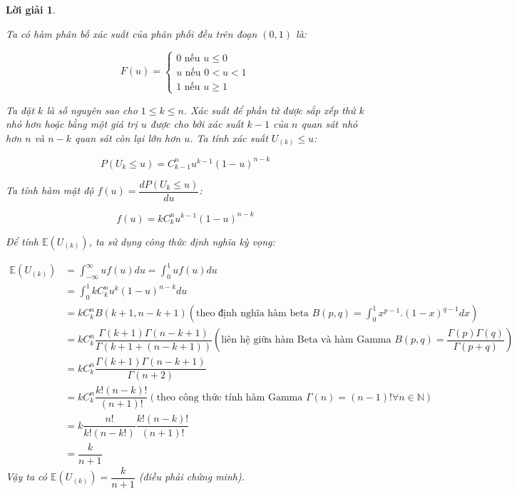 \documentclass[14pt, a4paper]{article}
\theoremstyle{sltheorem}
\theoremstyle{soltheorem}
\newtheorem*{loigiai}{Lời giải}
\begin{document}
\begin{loigiai}
\begin{enumerate}[wide, labelwidth=!, labelindent=0pt,label=\textbf{\arabic*}.]
\begin{enumerate}
            Ta có hàm phân bố xác suất của phân phối đều trên đoạn $(0, 1)$ là:

            \begin{equation*}
                F(u) = \begin{cases}
                    0 \text{ nếu } u \leq 0 \\
                    u \text{ nếu } 0 < u < 1 \\
                    1 \text{ nếu } u \geq 1                    
                \end{cases}
            \end{equation*}

            Ta đặt $k$ là số nguyên sao cho $1 \leq k \leq n$.
            Xác suất để phần tử được sắp xếp thứ $k$ nhỏ hơn hoặc bằng một giá trị $u$ được cho bởi xác suất $k-1$ của $n$ quan sát nhỏ hơn $n$ và $n-k$ quan sát còn lại lớn hơn $u$.
            Ta tính xác suất $U_{(k)} \leq u$:

            \begin{equation*}
                P(U_k \leq u) = C_{k-1}^n u^{k-1} (1-u)^{n-k}
            \end{equation*}

            Ta tính hàm mật độ $f(u) = \dfrac{d P(U_k \leq u)}{du}$:

            \begin{equation*}
                f(u) = k C_k^n u^{k-1} (1-u)^{n-k}
            \end{equation*}

            Để tính $\mathbb{E}(U_{(k)})$, ta sử dụng công thức định nghĩa kỳ vọng:

            \begin{equation*}
                \begin{aligned}
                    \mathbb{E} (U_{(k)}) &= \int_{-\infty}^{\infty} u f(u) du = \int_{0}^{1} u f(u) du \\
                    &= \int_{0}^{1} k C_k^n u^k (1-u)^{n-k} du \\
                    &= k C_k^n  B(k+1, n-k+1) (\text{theo định nghĩa hàm beta } B(p, q) = \int_{0}^{1} x^{p-1}. (1-x)^{q-1}dx) \\
                    &= k C_k^n \dfrac{\Gamma(k+1)\Gamma(n-k+1)}{\Gamma(k+1 + (n-k+1))} (\text{liên hệ giữa hàm Beta và hàm Gamma } B(p, q) = \dfrac{\Gamma(p)\Gamma(q)}{\Gamma(p+q)}) \\
                    &= k C_k^n \dfrac{\Gamma(k+1)\Gamma(n-k+1)}{\Gamma(n+2)} \\
                    &= k C_k^n \dfrac{k! (n-k)!}{(n+1)!} (\text{theo công thức tính hàm Gamma } \Gamma(n)=(n-1)! \forall n \in \mathbb{N}) \\
                    &= k \dfrac{n!}{k!(n-k!)} \dfrac{k!(n-k)!}{(n+1)!} \\
                    &= \dfrac{k}{n+1}
                \end{aligned}
            \end{equation*}
            Vậy ta có $\mathbb{E} (U_{(k)})= \dfrac{k}{n+1}$ (điều phải chứng minh).


\end{enumerate}
\end{enumerate}
\end{loigiai}
\end{document}
